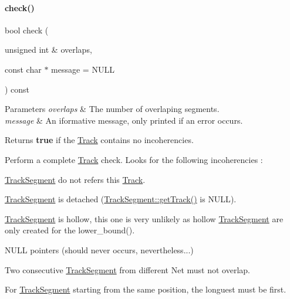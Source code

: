 \paragraph{\texorpdfstring{check()}{check()}}
{\footnotesize\ttfamily bool check (\begin{DoxyParamCaption}\item[{unsigned int \&}]{overlaps,  }\item[{const char $\ast$}]{message = {\ttfamily NULL} }\end{DoxyParamCaption}) const}


\begin{DoxyParams}{Parameters}
{\em overlaps} & The number of overlaping segments. \\
\hline
{\em message} & An iformative message, only printed if an error occurs. \\
\hline
\end{DoxyParams}
\begin{DoxyReturn}{Returns}
{\bfseries true} if the \mbox{\hyperlink{classKite_1_1Track}{Track}} contains no incoherencies.
\end{DoxyReturn}
Perform a complete \mbox{\hyperlink{classKite_1_1Track}{Track}} check. Looks for the following incoherencies \+:
\begin{DoxyItemize}
\item \mbox{\hyperlink{classKite_1_1TrackSegment}{Track\+Segment}} do not refers this \mbox{\hyperlink{classKite_1_1Track}{Track}}.
\item \mbox{\hyperlink{classKite_1_1TrackSegment}{Track\+Segment}} is detached (\mbox{\hyperlink{classKite_1_1TrackElement_a3f34f9139b8491a0adb531ac3a904171}{Track\+Segment\+::get\+Track()}} is {\ttfamily N\+U\+LL}).
\item \mbox{\hyperlink{classKite_1_1TrackSegment}{Track\+Segment}} is hollow, this one is very unlikely as hollow \mbox{\hyperlink{classKite_1_1TrackSegment}{Track\+Segment}} are only created for the {\ttfamily lower\+\_\+bound()}.
\item {\ttfamily N\+U\+LL} pointers (should never occurs, nevertheless...)
\item Two consecutive \mbox{\hyperlink{classKite_1_1TrackSegment}{Track\+Segment}} from different {\ttfamily Net} must not overlap.
\item For \mbox{\hyperlink{classKite_1_1TrackSegment}{Track\+Segment}} starting from the same position, the longuest must be first. 
\end{DoxyItemize}\mbox{\label{classKite_1_1Track_a893f1101c650c08c98612515c2b1a89c}} 
